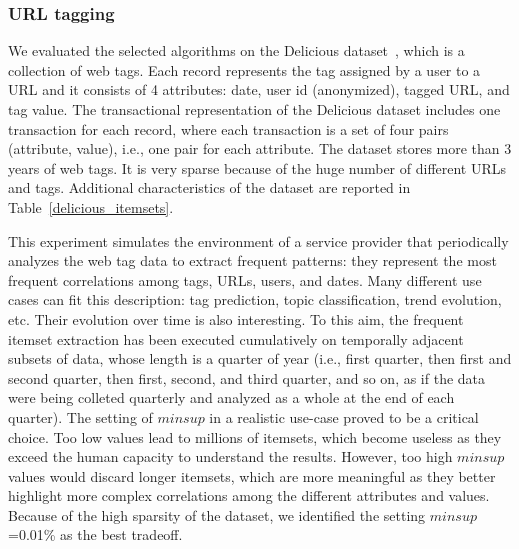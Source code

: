 \documentclass[preprint,review,12pt]{elsarticle}
\begin{document}
\subsubsection{URL tagging}
\label{delicious_exp}

We evaluated the selected algorithms on the Delicious dataset~\cite{wetzker2008analyzing}, which is a
collection of web tags.
Each record represents the tag assigned by a user to a URL and it consists of
4 attributes:
date,
user id (anonymized),
tagged URL,
and tag value.
The transactional representation of the Delicious dataset includes
one transaction for each record, where each transaction is a set of four pairs
(attribute, value), i.e., one pair for each attribute.
The dataset stores more than 3 years of web tags.
It is very sparse because of the huge number of different URLs
and tags.
Additional characteristics of the dataset are reported
in Table~\ref{delicious_itemsets}.

This experiment simulates the environment of a service provider that
periodically analyzes the web tag data to extract frequent patterns: they
represent the most frequent correlations among tags, URLs, users, and dates.
Many different use cases can fit this description:
tag prediction, topic classification, trend evolution, etc.
Their evolution over time is also interesting.
To this aim, the frequent itemset extraction has been executed
cumulatively on temporally adjacent subsets of data,
whose length is a quarter of year (i.e., first quarter,
then first and second quarter, then first, second, and third quarter, and so on,
as if the data were being colleted quarterly and analyzed as a whole at the
end of each quarter).
The setting of $minsup$ in a realistic use-case proved to be a critical choice.
Too low values lead to millions of itemsets,
which become useless as they exceed the human capacity to understand the results.
However, too high $minsup$ values would discard longer itemsets,
which are more meaningful
as they better highlight more complex correlations
among the different attributes and values.
Because of the high sparsity of the dataset,
we identified the setting $minsup$=0.01\% as the best tradeoff.
\end{document}
